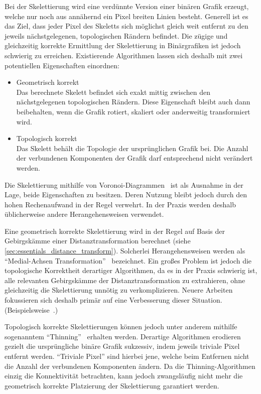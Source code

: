 Bei der Skelettierung wird eine verdünnte Version einer binären Grafik erzeugt, welche nur noch aus annähernd ein Pixel breiten Linien besteht.
Generell ist es das Ziel, dass jeder Pixel des Skeletts sich möglichst gleich weit entfernt zu den jeweils nächstgelegenen, topologischen Rändern befindet.
Die zügige und gleichzeitig korrekte Ermittlung der Skelettierung in Binärgrafiken ist jedoch schwierig zu erreichen.
Existierende Algorithmen lassen sich deshalb mit zwei potentiellen Eigenschaften einordnen:
\begin{itemize}
    \item Geometrisch korrekt \\
    Das berechnete Skelett befindet sich exakt mittig zwischen den nächstgelegenen topologischen Rändern.
    Diese Eigenschaft bleibt auch dann beibehalten, wenn die Grafik rotiert, skaliert oder anderweitig transformiert wird.
    \item Topologisch korrekt \\
    Das Skelett behält die Topologie der ursprünglichen Grafik bei.
    Die Anzahl der verbundenen Komponenten der Grafik darf entsprechend nicht verändert werden.
\end{itemize}

Die Skelettierung mithilfe von Voronoi-Diagrammen~\cite{DBLP:conf/cvpr/OgniewiczI92} ist als Ausnahme in der Lage, beide Eigenschaften zu besitzen.
Deren Nutzung bleibt jedoch durch den hohen Rechenaufwand in der Regel verwehrt.
In der Praxis werden deshalb üblicherweise andere Herangehensweisen verwendet.

Eine geometrisch korrekte Skelettierung wird in der Regel auf Basis der Gebirgskämme einer Distanztransformation berechnet (siehe \autoref{sec:essentials_distance_transform}).
Solcherlei Herangehensweisen werden als \enquote{Medial-Achsen Transformation}~\cite{Blum:1967:ATF} bezeichnet.
Ein großes Problem ist jedoch die topologische Korrektheit derartiger Algorithmen, da es in der Praxis schwierig ist, alle relevanten Gebirgskämme der Distanztransformation zu extrahieren, ohne gleichzeitig die Skelettierung unnötig zu verkomplizieren.
Neuere Arbeiten fokussieren sich deshalb primär auf eine Verbesserung dieser Situation. (Beispielsweise~\cite{DBLP:journals/cg/MonteroL12}.)

Topologisch korrekte Skelettierungen können jedoch unter anderem mithilfe sogenanntem \enquote{Thinning}~\cite{DBLP:journals/pami/LamLS92} erhalten werden.
Derartige Algorithmen erodieren gezielt die ursprüngliche binäre Grafik sukzessiv, indem jeweils triviale Pixel entfernt werden.
\enquote{Triviale Pixel} sind hierbei jene, welche beim Entfernen nicht die Anzahl der verbundenen Komponenten ändern.
Da die Thinning-Algorithmen einzig die Konnektivität betrachten, kann jedoch zwangsläufig nicht mehr die geometrisch korrekte Platzierung der Skelettierung garantiert werden.

